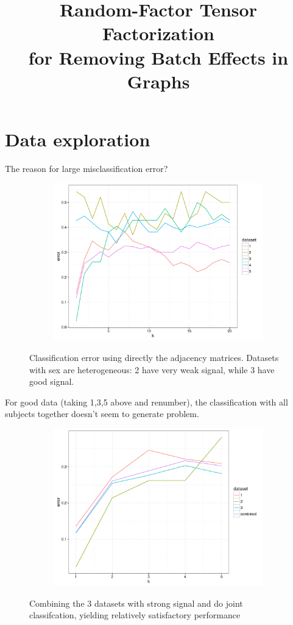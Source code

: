 \documentclass[12pt]{article}
\title
    {Random-Factor Tensor Factorization \\for Removing Batch Effects in Graphs}
\date{}
\newcommand{\bfi}{\begin{figure}[H]}
\newcommand{\efi}{\end{figure}}
\newcommand{\bsfi}{\begin{subfigure}[t]}
\newcommand{\esfi}{\end{subfigure}}
\begin{document}
\section{Data exploration}

The reason for large misclassification error?
\bfi
\centering
\bsfi{0.5\columnwidth}
\includegraphics[width=1\columnwidth]{../BatchEffectRemoval/sex_classification_raw_5dataset}
\esfi
\caption{Classification error using directly the adjacency matrices. Datasets with sex are heterogeneous: 2 have very weak signal, while 3 have good signal.}
\efi

For good data (taking 1,3,5 above and renumber), the classification with all subjects together doesn't seem to generate problem. 


\bfi
\centering
\bsfi{0.5\columnwidth}
\includegraphics[width=1\columnwidth]{../BatchEffectRemoval/selection_dataset_good.pdf}
\esfi
\caption{Combining the 3 datasets with strong signal and do joint classifcation, yielding relatively satisfactory performance}
\efi
\end{document}
